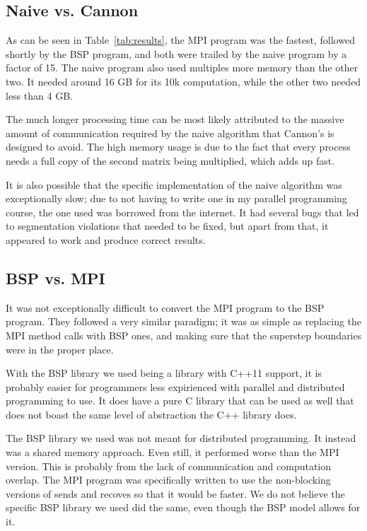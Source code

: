 \documentclass[paper=letter, fontsize=10pt]{scrartcl}
\begin{document}
\subsection{Naive vs. Cannon}

As can be seen in Table~\ref{tab:results}, the MPI program was the fastest, followed shortly by the BSP program, and both 
were trailed by the naive program by a factor of 15. The naive program also used multiples more memory than the other two. 
It needed around 16 GB for its 10k computation, while the other two needed less than 4 GB.

The much longer processing time can be most likely attributed to the massive amount of communication required by the naive 
algorithm that Cannon's is designed to avoid. The high memory usage is due to the fact that every process needs a full copy 
of the second matrix being multiplied, which adds up fast.

It is also possible that the specific implementation of the naive algorithm was exceptionally slow; due to not having to 
write one in my parallel programming course, the one used was borrowed from the internet. It had several bugs that led to 
segmentation violations that needed to be fixed, but apart from that, it appeared to work and produce correct results.

\subsection{BSP vs. MPI}

It was not exceptionally difficult to convert the MPI program to the BSP program. They followed a very similar paradigm; 
it was as simple as replacing the MPI method calls with BSP ones, and making sure that the superstep boundaries were in 
the proper place.

With the BSP library we used being a library with C++11 support, it is probably easier for programmers less expirienced with 
parallel and distributed programming to use. It does have a pure C library that can be used as well that does not boast 
the same level of abstraction the C++ library does.

The BSP library we used was not meant for distributed programming. It instead was a shared memory approach. Even still, it 
performed worse than the MPI version. This is probably from the lack of communication and computation overlap. The MPI 
program was specifically written to use the non-blocking versions of sends and recoves so that it would be faster. We do 
not believe the specific BSP library we used did the same, even though the BSP model allows for it.

\end{document}
